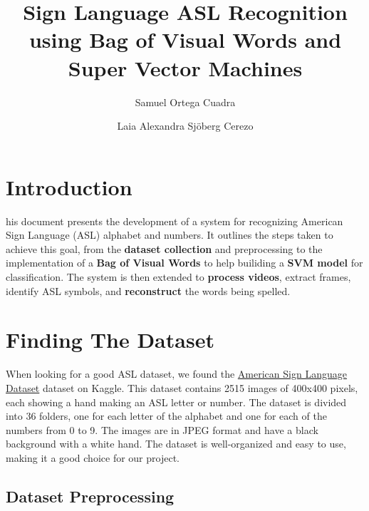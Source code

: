 \documentclass[9pt,a4paper,twoside]{tau-class/tau}
\title{Sign Language ASL Recognition using Bag of Visual Words and Super Vector Machines}
\author[a]{Samuel Ortega Cuadra}
\author[b]{Laia Alexandra Sjöberg Cerezo}
\affil[a]{1669776}
\affil[b]{1667894}
\begin{document}
    \maketitle 
    \thispagestyle{firststyle} \tauabstract 
    \tableofcontents
    \linenumbers 
    

\section{Introduction}

    his document presents the development of a system for recognizing American Sign Language (ASL) alphabet and numbers. It outlines the steps taken to achieve this goal, from the \textbf{dataset collection} and preprocessing to the implementation of a \textbf{Bag of Visual Words} to help builiding a \textbf{SVM model} for classification. The system is then extended to \textbf{process videos}, extract frames, identify ASL symbols, and \textbf{reconstruct} the words being spelled.
\section{Finding The Dataset}

	When looking for a good ASL dataset, we found the \href{https://www.kaggle.com/datasets/ayuraj/asl-dataset}{American Sign Language Dataset} dataset on Kaggle. This dataset contains 2515 images of 400x400 pixels, each showing a hand making an ASL letter or number. The dataset is divided into 36 folders, one for each letter of the alphabet and one for each of the numbers from 0 to 9. The images are in JPEG format and have a black background with a white hand. The dataset is well-organized and easy to use, making it a good choice for our project.

    \subsection{Dataset Preprocessing}
\end{document}
